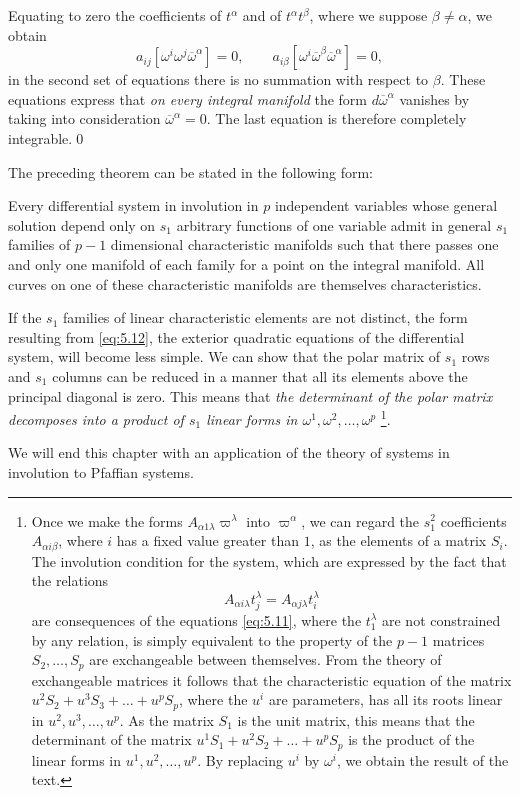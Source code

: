 Equating to zero the coefficients of $t^{\alpha}$ and of $t^{\alpha}t^{\beta}$, where we suppose $\beta\neq\alpha$, we obtain
\[
a_{ij}[\omega^{i}\omega^{j}\overline\omega^{\alpha}]=0,\qquad a_{i\beta}[\omega^{i}\overline\omega^{\beta}\overline\omega^{\alpha}]=0,
\]
in the second set of equations there is no summation with respect to $\beta$. These equations express that \emph{on every integral manifold} the form $d\overline\omega^{\alpha}$ vanishes by taking into consideration $\overline\omega^{\alpha}=0$. The last equation is therefore completely integrable.\qed


\vspace{12pt}\fsec The preceding theorem can be stated in the following form:
\begin{thm*}
  Every differential system in involution in $p$ independent variables whose general solution depend only on $s_{1}$ arbitrary functions of one variable admit in general $s_{1}$ families of $p-1$ dimensional characteristic manifolds such that there passes one and only one manifold of each family for a point on the integral manifold. All curves on one of these characteristic manifolds are themselves characteristics.
\end{thm*}

\begin{rmk*}
  If the $s_{1}$ families of linear characteristic elements are not distinct, the form resulting from \eqref{eq:5.12}, the exterior quadratic equations of the differential system, will become less simple. We can show that the polar matrix of $s_{1}$ rows and $s_{1}$ columns can be reduced in a manner that all its elements above the principal diagonal is zero. This means that \emph{the determinant of the polar matrix decomposes into a product of $s_{1}$ linear forms in $\omega^{1},\omega^{2},\dots,\omega^{p}$} \footnote{Once we make the forms $A_{\alpha1\lambda}\varpi^{\lambda}$ into $\varpi^{\alpha}$, we can regard the $s_{1}^{2}$ coefficients $A_{\alpha i\beta}$, where $i$ has a fixed value greater than $1$, as the elements of a matrix $S_{i}$. The involution condition for the system, which are expressed by the fact that the relations
\[
A_{\alpha i\lambda}t^{\lambda}_{j}=A_{\alpha j\lambda}t^{\lambda}_{i}
\]
are consequences of the equations \eqref{eq:5.11}, where the $t_{1}^{\lambda}$ are not constrained by any relation, is simply equivalent to the property of the $p-1$ matrices $S_{2},\dots,S_{p}$ are exchangeable between themselves. From the theory of exchangeable matrices it follows that the characteristic equation of the matrix $u^{2}S_{2}+u^{3}S_{3}+\dots+u^{p}S_{p}$, where the $u^{i}$ are parameters, has all its roots linear in $u^{2},u^{3},\dots,u^{p}$. As the matrix $S_{1}$ is the unit matrix, this means that the determinant of the matrix $u^{1}S_{1}+u^{2}S_{2}+\dots+u^{p}S_{p}$ is the product of the linear forms in $u^{1},u^{2},\dots,u^{p}$. By replacing $u^{i}$ by $\omega^{i}$, we obtain the result of the text.
}.

We will end this chapter with an application of the theory of systems in involution to Pfaffian systems.

\end{rmk*}


